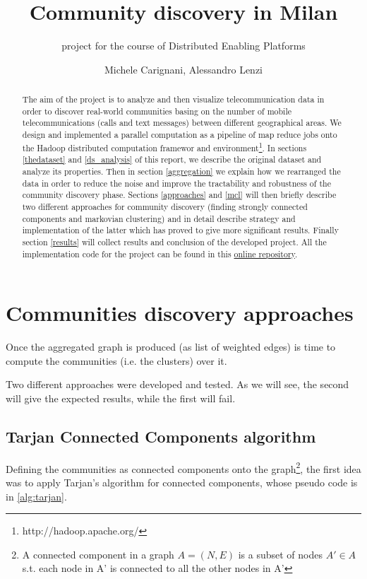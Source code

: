 \documentclass[12pt,a4paper]{article}
\author{Michele Carignani, Alessandro Lenzi}
\title{Community discovery in Milan}
\subtitle{project for the course of Distributed Enabling Platforms}
\begin{document}
\maketitle
\tableofcontents
\newpage

\begin{abstract}
The aim of the project is to analyze and then visualize telecommunication data
in order to discover real-world communities basing on the number of mobile telecommunications (calls and text messages) 
between different geographical areas. We design and implemented 
a parallel computation as a pipeline of
map reduce jobs onto the Hadoop distributed computation
framewor and environment\footnote{http://hadoop.apache.org/}.
In sections \ref{thedataset} and \ref{ds_analysis} of this report, we describe the original dataset
and analyze its properties. Then in section \ref{aggregation}
we explain how we rearranged the data in
order to reduce the noise and improve the tractability and robustness of the
community discovery phase. Sections \ref{approaches} and \ref{mcl} will then
briefly describe two different approaches for community discovery
(finding strongly connected components and markovian clustering)
and in detail describe strategy and implementation of the latter which has
proved to give more significant results.
Finally section \ref{results} will collect results and conclusion of the developed project.
All the implementation code for the project can be found in this
\href{''https://github.com/michele-carignani/hadoop-markov-clustering/''}{online repository}.
\end{abstract}
\newpage

\newpage





\section{Communities discovery approaches}
\label{approaches}

Once the aggregated graph is produced (as list of weighted edges) is time to compute
the communities (i.e. the clusters) over it.

Two different approaches were developed and tested. 
As we will see, the second will give the
expected results, while the first will fail.

\subsection{Tarjan Connected Components algorithm}
Defining the communities as connected components onto the graph\footnote{A connected component
in a graph $A = (N,E)$ is a subset of nodes $A' \in A$  s.t. each node in A' is connected to 
all the other nodes in A' 
}, the first idea was to apply Tarjan's algorithm for connected components, whose pseudo code is in \ref{alg:tarjan}.
\end{document}
